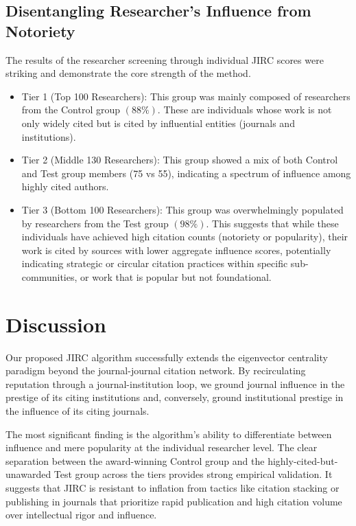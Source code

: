 \documentclass[10pt]{article}
\begin{document}
\subsection{Disentangling Researcher's Influence from Notoriety}
The results of the researcher screening through individual JIRC scores were striking and demonstrate the core strength of the method.
\begin{itemize}
\item Tier 1 (Top 100 Researchers): This group was mainly composed  of researchers from the Control group $(88\%)$. These are individuals whose work is not only widely cited but is cited by influential entities (journals and institutions).
\item Tier 2 (Middle 130 Researchers): This group showed a mix of both Control and Test group members (75 vs 55), indicating a spectrum of influence among highly cited authors.
\item Tier 3 (Bottom 100 Researchers): This group was overwhelmingly populated by researchers from the Test group $(98\%)$. This suggests that while these individuals have achieved high citation counts (notoriety or popularity), their work is cited by sources with lower aggregate influence scores, potentially indicating strategic or circular citation practices within specific sub-communities, or work that is popular but not foundational.
    \end{itemize}
\section{Discussion}

Our proposed JIRC algorithm successfully extends the eigenvector centrality paradigm beyond the journal-journal citation network. By recirculating reputation through a journal-institution loop, we ground journal influence in the prestige of its citing institutions and, conversely, ground institutional prestige in the influence of its citing journals.

The most significant finding is the algorithm's ability to differentiate between influence and mere popularity at the individual researcher level. The clear separation between the award-winning Control group and the highly-cited-but-unawarded Test group across the tiers provides strong empirical validation. It suggests that JIRC is resistant to inflation from tactics like citation stacking or publishing in journals that prioritize rapid publication and high citation volume over intellectual rigor and influence.
\end{document}
